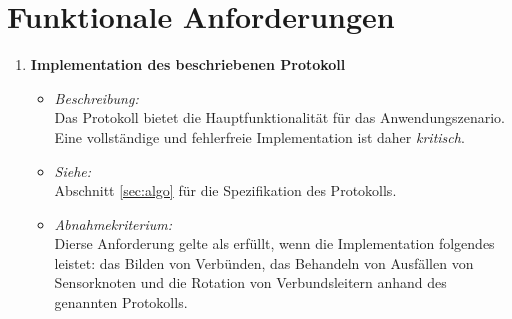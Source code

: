 \section{Funktionale Anforderungen} \label{sec:features}
\begin{enumerate}
\item \textbf{Implementation des beschriebenen Protokoll}
  \begin{itemize}
  \item \emph{Beschreibung:}\\
    Das Protokoll bietet die Hauptfunktionalit\"at f\"ur das Anwendungszenario. Eine vollst\"andige und fehlerfreie Implementation ist daher \emph{kritisch}.

  \item \emph{Siehe:}\\
    Abschnitt \ref{sec:algo} f\"ur die Spezifikation des Protokolls.
  \item \emph{Abnahmekriterium:}\\
    Dierse Anforderung gelte als erf\"ullt, wenn die Implementation folgendes leistet: das Bilden von Verb\"unden, das Behandeln von Ausf\"allen von Sensorknoten und die Rotation von Verbundsleitern anhand des genannten Protokolls.
  \end{itemize}


\end{enumerate}
